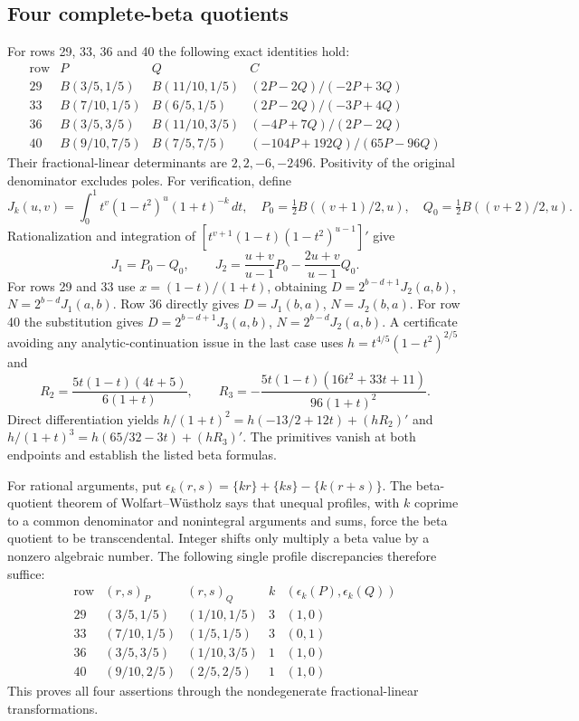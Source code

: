 \documentclass[11pt,a4paper]{article}
\theoremstyle{definition}
\theoremstyle{remark}
\numberwithin{equation}{section}
\begin{document}
\subsection{Four complete-beta quotients}
\label{dbkz-sec:betafour}
For rows 29, 33, 36 and 40 the following exact identities hold:
\[
\begin{array}{c|c|c|c}
\text{row}&P&Q&C\\\hline
29&B(3/5,1/5)&B(11/10,1/5)&(2P-2Q)/(-2P+3Q)\\
33&B(7/10,1/5)&B(6/5,1/5)&(2P-2Q)/(-3P+4Q)\\
36&B(3/5,3/5)&B(11/10,3/5)&(-4P+7Q)/(2P-2Q)\\
40&B(9/10,7/5)&B(7/5,7/5)&(-104P+192Q)/(65P-96Q)
\end{array}
\]
Their fractional-linear determinants are $2,2,-6,-2496$. Positivity of
the original denominator excludes poles.
For verification, define
\[
 J_k(u,v)=\int_0^1t^v(1-t^2)^u(1+t)^{-k}\,dt,
 \quad P_0=\tfrac12B((v+1)/2,u),\quad
 Q_0=\tfrac12B((v+2)/2,u).
\]
Rationalization and integration of
$[t^{v+1}(1-t)(1-t^2)^{u-1}]'$ give
\[
 J_1=P_0-Q_0,\qquad
 J_2=\frac{u+v}{u-1}P_0-\frac{2u+v}{u-1}Q_0.
\]
For rows 29 and 33 use $x=(1-t)/(1+t)$, obtaining
$D=2^{b-d+1}J_2(a,b)$, $N=2^{b-d}J_1(a,b)$.
Row 36 directly gives $D=J_1(b,a)$, $N=J_2(b,a)$.
For row 40 the substitution gives
$D=2^{b-d+1}J_3(a,b)$, $N=2^{b-d}J_2(a,b)$.
A certificate avoiding any analytic-continuation issue in the last case
uses $h=t^{4/5}(1-t^2)^{2/5}$ and
\[
 R_2=\frac{5t(1-t)(4t+5)}{6(1+t)},\qquad
 R_3=-\frac{5t(1-t)(16t^2+33t+11)}{96(1+t)^2}.
\]
Direct differentiation yields
$h/(1+t)^2=h(-13/2+12t)+(hR_2)'$ and
$h/(1+t)^3=h(65/32-3t)+(hR_3)'$.
The primitives vanish at both endpoints and establish the listed beta
formulas.

For rational arguments, put
$\epsilon_k(r,s)=\{kr\}+\{ks\}-\{k(r+s)\}$.
The beta-quotient theorem of Wolfart--W\"ustholz
\cite[Satz 4]{dbkz-ww} says that unequal profiles, with $k$ coprime
to a common denominator and nonintegral arguments and sums, force the
beta quotient to be transcendental. Integer shifts only multiply a
beta value by a nonzero algebraic number. The following single
profile discrepancies therefore suffice:
\[
\begin{array}{c|c|c|c|c}
\text{row}&(r,s)_P&(r,s)_Q&k&(\epsilon_k(P),\epsilon_k(Q))\\\hline
29&(3/5,1/5)&(1/10,1/5)&3&(1,0)\\
33&(7/10,1/5)&(1/5,1/5)&3&(0,1)\\
36&(3/5,3/5)&(1/10,3/5)&1&(1,0)\\
40&(9/10,2/5)&(2/5,2/5)&1&(1,0)
\end{array}
\]
This proves all four assertions through the nondegenerate
fractional-linear transformations.
\end{document}
